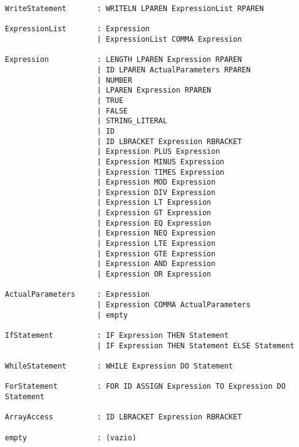 \documentclass[12pt,a4paper]{report}%
\begin{document}
\begin{verbatim}
WriteStatement       : WRITELN LPAREN ExpressionList RPAREN

ExpressionList       : Expression
                     | ExpressionList COMMA Expression

Expression           : LENGTH LPAREN Expression RPAREN
                     | ID LPAREN ActualParameters RPAREN
                     | NUMBER
                     | LPAREN Expression RPAREN
                     | TRUE
                     | FALSE
                     | STRING_LITERAL
                     | ID
                     | ID LBRACKET Expression RBRACKET
                     | Expression PLUS Expression
                     | Expression MINUS Expression
                     | Expression TIMES Expression
                     | Expression MOD Expression
                     | Expression DIV Expression
                     | Expression LT Expression
                     | Expression GT Expression
                     | Expression EQ Expression
                     | Expression NEQ Expression
                     | Expression LTE Expression
                     | Expression GTE Expression
                     | Expression AND Expression
                     | Expression OR Expression

ActualParameters     : Expression
                     | Expression COMMA ActualParameters
                     | empty

IfStatement          : IF Expression THEN Statement
                     | IF Expression THEN Statement ELSE Statement

WhileStatement       : WHILE Expression DO Statement

ForStatement         : FOR ID ASSIGN Expression TO Expression DO Statement

ArrayAccess          : ID LBRACKET Expression RBRACKET

empty                : (vazio)
\end{verbatim}
\end{document}
